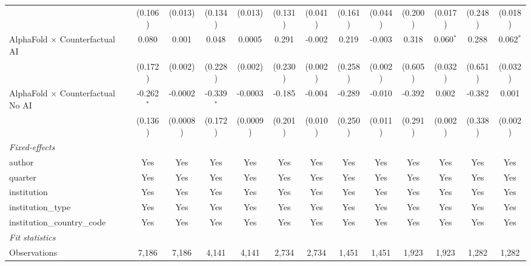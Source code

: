 \begin{tabular}{lcccccccccccc}
                                            & (0.106)      & (0.013)       & (0.134)      & (0.013)       & (0.131) & (0.041) & (0.161) & (0.044) & (0.200) & (0.017)     & (0.248) & (0.018)\\   
   AlphaFold $\times$ Counterfactual AI     & 0.080        & 0.001         & 0.048        & 0.0005        & 0.291   & -0.002  & 0.219   & -0.003  & 0.318   & 0.060$^{*}$ & 0.288   & 0.062$^{*}$\\   
                                            & (0.172)      & (0.002)       & (0.228)      & (0.002)       & (0.230) & (0.002) & (0.258) & (0.002) & (0.605) & (0.032)     & (0.651) & (0.032)\\   
   AlphaFold $\times$ Counterfactual No AI  & -0.262$^{*}$ & -0.0002       & -0.339$^{*}$ & -0.0003       & -0.185  & -0.004  & -0.289  & -0.010  & -0.392  & 0.002       & -0.382  & 0.001\\   
                                            & (0.136)      & (0.0008)      & (0.172)      & (0.0009)      & (0.201) & (0.010) & (0.250) & (0.011) & (0.291) & (0.002)     & (0.338) & (0.002)\\   
   \midrule
   \emph{Fixed-effects}\\
   author                                   & Yes          & Yes           & Yes          & Yes           & Yes     & Yes     & Yes     & Yes     & Yes     & Yes         & Yes     & Yes\\  
   quarter                                  & Yes          & Yes           & Yes          & Yes           & Yes     & Yes     & Yes     & Yes     & Yes     & Yes         & Yes     & Yes\\  
   institution                              & Yes          & Yes           & Yes          & Yes           & Yes     & Yes     & Yes     & Yes     & Yes     & Yes         & Yes     & Yes\\  
   institution\_type                        & Yes          & Yes           & Yes          & Yes           & Yes     & Yes     & Yes     & Yes     & Yes     & Yes         & Yes     & Yes\\  
   institution\_country\_code               & Yes          & Yes           & Yes          & Yes           & Yes     & Yes     & Yes     & Yes     & Yes     & Yes         & Yes     & Yes\\  
   \midrule
   \emph{Fit statistics}\\
   Observations                             & 7,186        & 7,186         & 4,141        & 4,141         & 2,734   & 2,734   & 1,451   & 1,451   & 1,923   & 1,923       & 1,282   & 1,282\\  

\end{tabular}
